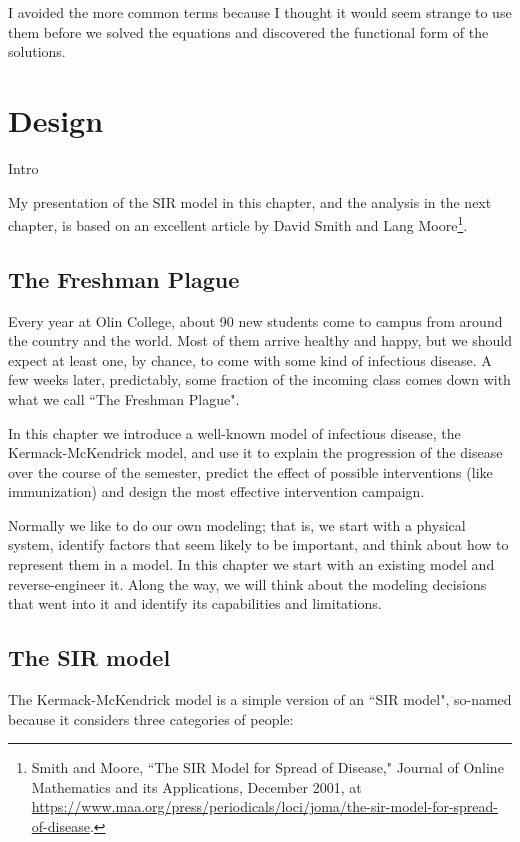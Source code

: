 \documentclass[12pt]{book}
\theoremstyle{exercise}
\begin{document}
I avoided the more common terms because I thought it would seem strange to use them before we solved the equations and discovered the functional form of the solutions.




\chapter{Design}

Intro

My presentation of the SIR model in this chapter, and the analysis in the next chapter, is based on an excellent article by David Smith and Lang Moore\footnote{Smith and Moore, ``The SIR Model for Spread of Disease," Journal of Online Mathematics and its Applications, December 2001, at \url{https://www.maa.org/press/periodicals/loci/joma/the-sir-model-for-spread-of-disease}.}.

\section{The Freshman Plague}

Every year at Olin College, about 90 new students come to campus from around the country and the world.  Most of them arrive healthy and happy, but we should expect at least one, by chance, to come with some kind of infectious disease.  A few weeks later, predictably, some fraction of the incoming class comes down with what we call ``The Freshman Plague".

In this chapter we introduce a well-known model of infectious disease, the Kermack-McKendrick model, and use it to explain the progression of the disease over the course of the semester, predict the effect of possible interventions (like immunization) and design the most effective intervention campaign.

Normally we like to do our own modeling; that is, we start with a physical system, identify factors that seem likely to be important, and think about how to represent them in a model.  In this chapter we start with an existing model and reverse-engineer it.  Along the way, we will think about the modeling decisions that went into it and identify its capabilities and limitations.

\section{The SIR model}

The Kermack-McKendrick model is a simple version of an ``SIR model", so-named because it considers three categories of people:
\end{document}
